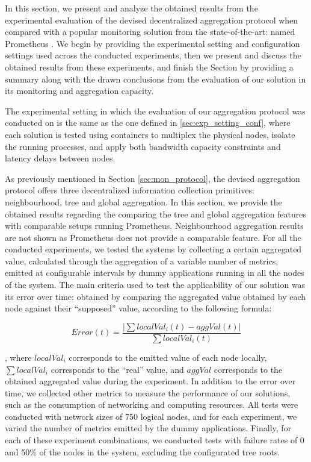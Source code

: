 

In this section, we present and analyze the obtained results from the experimental evaluation of the devised decentralized aggregation protocol when compared with a popular monitoring solution from the state-of-the-art: named Prometheus \cite{prometheus}. We begin by providing the experimental setting and configuration settings used across the conducted experiments, then we present and discuss the obtained results from these experiments, and finish the Section by providing a summary along with the drawn conclusions from the evaluation of our solution in its monitoring and aggregation capacity.

The experimental setting in which the evaluation of our aggregation protocol was conducted on is the same as the one defined in \ref{sec:exp_setting_conf}, where each solution is tested using containers to multiplex the physical nodes, isolate the running processes, and apply both bandwidth capacity constraints and latency delays between nodes.

As previously mentioned in Section \ref{sec:mon_protocol}, the devised aggregation protocol offers three decentralized information collection primitives: neighbourhood, tree and global aggregation. In this section, we provide the obtained results regarding the comparing the tree and global aggregation features with comparable setups running Prometheus. Neighbourhood aggregation results are not shown as Prometheus does not provide a comparable feature. For all the conducted experiments, we tested the systems by collecting a certain aggregated value, calculated through the aggregation of a variable number of metrics, emitted at configurable intervals by dummy applications running in all the nodes of the system. The main criteria used to test the applicability of our solution was its error over time: obtained by comparing the aggregated value obtained by each node against their ``supposed'' value, according to the following formula: 

\[ Error(t) =  \frac{|\sum localVal_i(t) - aggVal(t)|}{\sum localVal_i(t)}\]

, where $localVal_i$ corresponds to the emitted value of each node locally, $\sum localVal_i$ corresponds to the ``real'' value, and $aggVal$ corresponds to the obtained aggregated value during the experiment. In addition to the error over time, we collected other metrics to measure the performance of our solutions, such as the consumption of networking and computing resources. All tests were conducted with network sizes of 750 logical nodes, and for each experiment, we varied the number of metrics emitted by the dummy applications. Finally, for each of these experiment combinations, we conducted tests with failure rates of 0 and 50\% of the nodes in the system, excluding the configurated tree roots.

